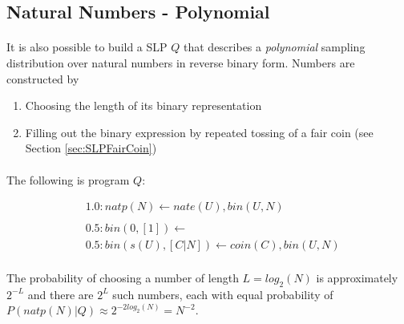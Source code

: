 \documentclass{article}
\theoremstyle{plain}
\theoremstyle{definition}
\begin{document}
\begin{multicols}{2}
\subsection{Natural Numbers - Polynomial}

\paragraph{} It is also possible to build a SLP $Q$ that describes a \textit{polynomial} sampling distribution over natural numbers in reverse binary form\cite[pp. 8-9]{muggleton96}. Numbers are constructed by

\begin{enumerate}
\item Choosing the length of its binary representation
\item Filling out the binary expression by repeated tossing of a fair coin (see Section \ref{sec:SLPFairCoin})
\end{enumerate}

\paragraph{} The following is program $Q$:

\begin{align*}
&1.0: natp(N) \leftarrow nate(U), bin(U, N)\\
\\
&0.5: bin(0, [1]) \leftarrow\\
&0.5: bin(s(U), [C|N]) \leftarrow coin(C), bin(U, N)
\end{align*}

\paragraph{} The probability of choosing a number of length $L = log_2(N)$ is approximately $2^{-L}$ and there are $2^L$ such numbers, each with equal probability of $P(natp(N)|Q) \approx 2^{-2log_2(N)} = N^{-2}$.

\end{multicols}



\end{document}
